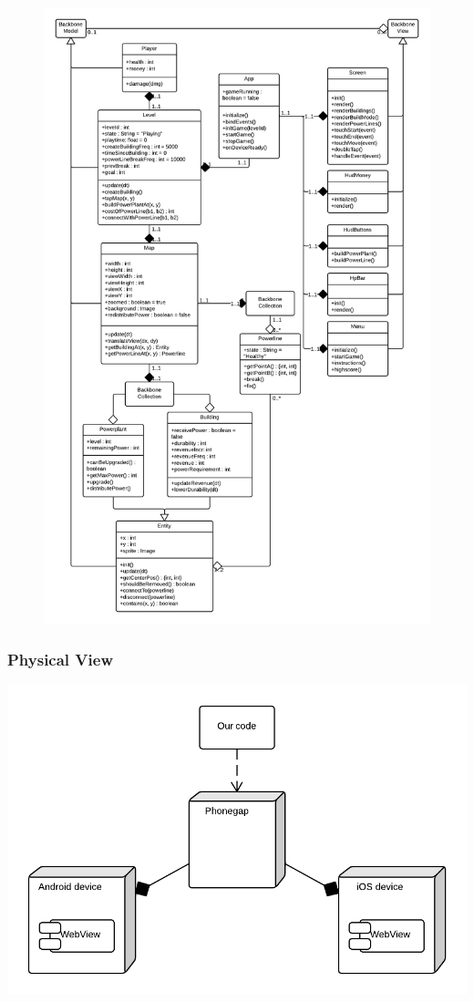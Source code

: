 \begin{figure}[H]
\centering
\includegraphics[width=\textwidth, height=\textheight, keepaspectratio]{pictures/class_diagram}
\end{figure}

\subsubsection{Physical View}

\includegraphics[width=\textwidth]{pictures/deployment_diagram}

